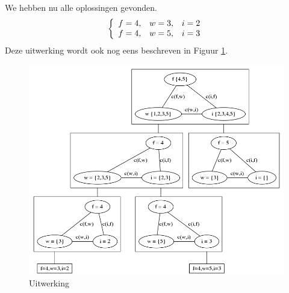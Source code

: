 \documentclass[alternative-exam.tex]{subfiles}
\begin{document}
We hebben nu alle oplossingen gevonden.
\[
\left\lbrace
\begin{array}{c c c}
f=4,& w=3,& i=2\\
f=4,& w=5,& i=3\\
\end{array}
\right.
\] 
Deze uitwerking wordt ook nog eens beschreven in Figuur \ref{uitwerking}.
\begin{figure}
[p]
\centering
\caption{Uitwerking}
\label{uitwerking}
\includegraphics[scale=0.45]{resources/graphs/uitwerking.png}
\end{figure}
\end{document}
